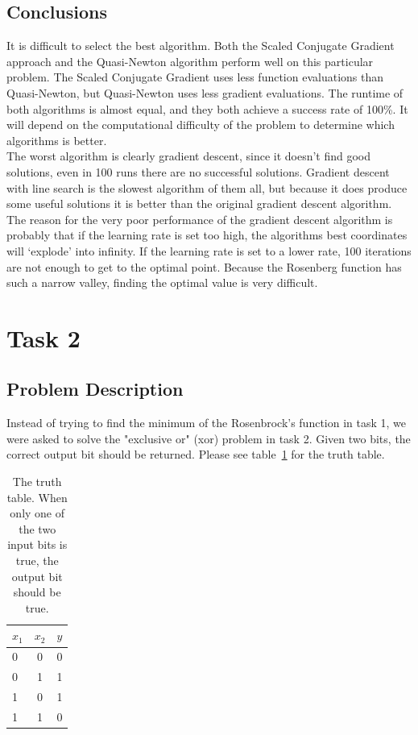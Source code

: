 \documentclass{article}
\begin{document}
\subsection{Conclusions}
It is difficult to select the best algorithm. Both the Scaled Conjugate Gradient approach and the Quasi-Newton algorithm perform well on this particular problem. The Scaled Conjugate Gradient uses less function evaluations than Quasi-Newton, but Quasi-Newton uses less gradient evaluations. The runtime of both algorithms is almost equal, and they both achieve a success rate of 100\%. It will depend on the computational difficulty of the problem to determine which algorithms is better. \\
The worst algorithm is clearly gradient descent, since it doesn't find good solutions, even in 100 runs there are no successful solutions. Gradient descent with line search is the slowest algorithm of them all, but because it does produce some useful solutions it is better than the original gradient descent algorithm.
The reason for the very poor performance of the gradient descent algorithm is probably that if the learning rate is set too high, the algorithms best coordinates will `explode' into infinity. If the learning rate is set to a lower rate, 100 iterations are not enough to get to the optimal point. Because the Rosenberg function has such a narrow valley, finding the optimal value is very difficult.

\section{Task 2}
\subsection{Problem Description}
Instead of trying to find the minimum of the Rosenbrock's function in task 1, we were asked to solve the "exclusive or" (xor) problem in task 2. Given two bits, the correct output bit should be returned. Please see table~\ref{tab:tt} for the truth table.

\begin{table}[H]
	\centering
	\begin{tabular}{| l | c | r |}
		\hline
		$x_1$ & $x_2$ & $y$ \\ \hline
		0 & 0 & 0 \\ \hline
		0 & 1 & 1 \\ \hline
		1 & 0 & 1 \\ \hline
		1 & 1 & 0 \\ \hline
	\end{tabular}
	\caption{The truth table. When only one of the two input bits is true, the output bit should be true.}
	\label{tab:tt}
\end{table}
\end{document}
